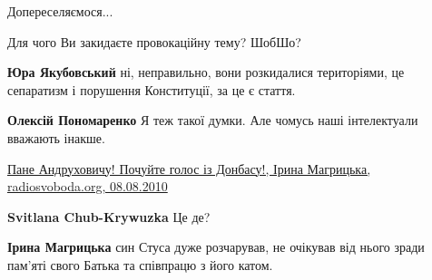 \begin{itemize}
\begin{itemize}
Допереселяємося...

 
Для чого Ви закидаєте провокаційну тему? ШобШо?

 
\textbf{Юра Якубовський} ні, неправильно, вони розкидалися територіями, це сепаратизм і порушення Конституції, за це є стаття.

 
\textbf{Олексій Пономаренко} Я теж такої думки. Але чомусь наші інтелектуали вважають інакше. 

\href{https://www.radiosvoboda.org/a/2122151.html}{%
Пане Андруховичу! Почуйте голос із Донбасу!, Ірина Магрицька, radiosvoboda.org, 08.08.2010%
}

 
\textbf{Svitlana Chub-Krywuzka} Це де?

 
\textbf{Ірина Магрицька} син Стуса дуже розчарував, не очікував від нього зради пам'яті свого Батька та співпрацю з його катом.

 

\end{itemize}
\end{itemize}
